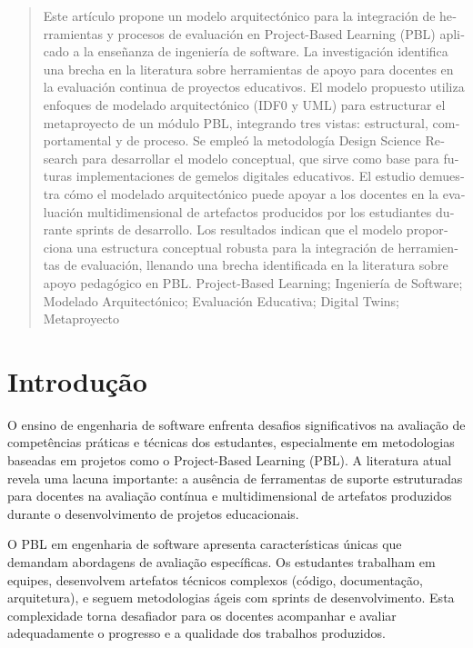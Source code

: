 \documentclass[english, spanish, brazilian]{RBIEarticle} %
\begin{document}
\begin{otherlanguage}{spanish}
\begin{abstract}
Este artículo propone un modelo arquitectónico para la integración de herramientas y procesos de evaluación en Project-Based Learning (PBL) aplicado a la enseñanza de ingeniería de software. La investigación identifica una brecha en la literatura sobre herramientas de apoyo para docentes en la evaluación continua de proyectos educativos. El modelo propuesto utiliza enfoques de modelado arquitectónico (IDF0 y UML) para estructurar el metaproyecto de un módulo PBL, integrando tres vistas: estructural, comportamental y de proceso. Se empleó la metodología Design Science Research para desarrollar el modelo conceptual, que sirve como base para futuras implementaciones de gemelos digitales educativos. El estudio demuestra cómo el modelado arquitectónico puede apoyar a los docentes en la evaluación multidimensional de artefactos producidos por los estudiantes durante sprints de desarrollo. Los resultados indican que el modelo proporciona una estructura conceptual robusta para la integración de herramientas de evaluación, llenando una brecha identificada en la literatura sobre apoyo pedagógico en PBL.
\keywords Project-Based Learning; Ingeniería de Software; Modelado Arquitectónico; Evaluación Educativa; Digital Twins; Metaproyecto
\end{abstract}
\end{otherlanguage}

\pagebreak


\section{Introdução}

O ensino de engenharia de software enfrenta desafios significativos na avaliação de competências práticas e técnicas dos estudantes, especialmente em metodologias baseadas em projetos como o Project-Based Learning (PBL). A literatura atual revela uma lacuna importante: a ausência de ferramentas de suporte estruturadas para docentes na avaliação contínua e multidimensional de artefatos produzidos durante o desenvolvimento de projetos educacionais.

O PBL em engenharia de software apresenta características únicas que demandam abordagens de avaliação específicas. Os estudantes trabalham em equipes, desenvolvem artefatos técnicos complexos (código, documentação, arquitetura), e seguem metodologias ágeis com sprints de desenvolvimento. Esta complexidade torna desafiador para os docentes acompanhar e avaliar adequadamente o progresso e a qualidade dos trabalhos produzidos.
\end{document}
